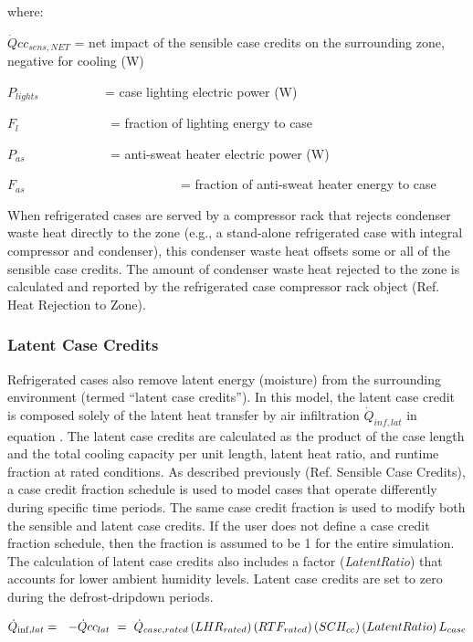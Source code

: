where:

\(\dot Qc{c_{sens,NET}}\) = net impact of the sensible case credits on the surrounding zone, negative for cooling (W)

\({P_{lights}}\) ~~~~~~~~~ = case lighting electric power (W)

\({F_l}\) ~~~~~~~~~~~~~ = fraction of lighting energy to case

\({P_{as}}\) ~~~~~~~~~~~~ = anti-sweat heater electric power (W)

\({F_{as}}\) ~~~~~~~~~~~~~~~~~~~~~~~ = fraction of anti-sweat heater energy to case

When refrigerated cases are served by a compressor rack that rejects condenser waste heat directly to the zone (e.g., a stand-alone refrigerated case with integral compressor and condenser), this condenser waste heat offsets some or all of the sensible case credits. The amount of condenser waste heat rejected to the zone is calculated and reported by the refrigerated case compressor rack object (Ref. Heat Rejection to Zone).

\subsubsection{Latent Case Credits}\label{latent-case-credits}

Refrigerated cases also remove latent energy (moisture) from the surrounding environment (termed ``latent case credits''). In this model, the latent case credit is composed solely of the latent heat transfer by air infiltration \({\dot Q_{inf,lat}}\) in equation . The latent case credits are calculated as the product of the case length and the total cooling capacity per unit length, latent heat ratio, and runtime fraction at rated conditions. As described previously (Ref. Sensible Case Credits), a case credit fraction schedule is used to model cases that operate differently during specific time periods. The same case credit fraction is used to modify both the sensible and latent case credits. If the user does not define a case credit fraction schedule, then the fraction is assumed to be 1 for the entire simulation. The calculation of latent case credits also includes a factor (\emph{LatentRatio}) that accounts for lower ambient humidity levels. Latent case credits are set to zero during the defrost-dripdown periods.

\begin{equation}
{\dot Q_{{\rm{inf}},lat}} = \,\,\,\, - \dot Qc{c_{lat}}\,\, = \,\,{\dot Q_{case,rated}}\left( {LH{R_{rated}}} \right)\left( {RT{F_{rated}}} \right)\left( {SC{H_{cc}}} \right)\left( {LatentRatio} \right){L_{case}}
\end{equation}

